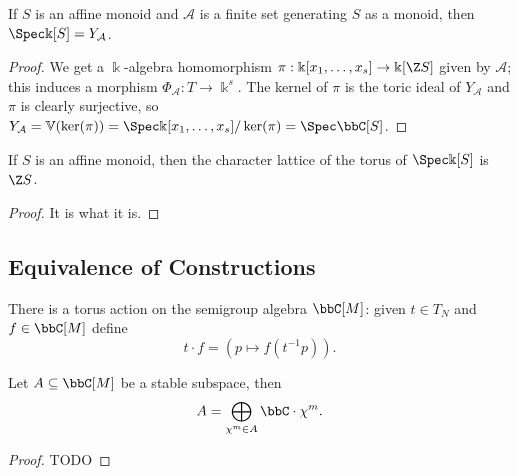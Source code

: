 \begin{proposition}
  \label{1-1-14-spec-aff-mon-alg-eq-ya}

  If $S$ is an affine monoid and $\mathcal A$ is a finite set generating $S$ as a monoid, then $\Spec \Bbbk[S] = Y_{\mathcal A}$.
\end{proposition}
\begin{proof}

  We get a $\Bbbk$-algebra homomorphism $\pi : \Bbbk[x_1, \dotsc, x_s] \to \Bbbk[\Z S]$ given by $\mathcal A$; this induces a morphism $\Phi_{\mathcal A} : T \to \Bbbk^s$. The kernel of $\pi$ is the toric ideal of $Y_{\mathcal A}$ and $\pi$ is clearly surjective, so $Y_{\mathcal A} = \mathbb V(\ker(\pi)) = \Spec \Bbbk[x_1, \dotsc, x_s] / \ker(\pi) = \Spec \bbC[S]$.
\end{proof}


\begin{proposition}
  \label{1-1-14-char-spec-aff-mon-alg}

  If $S$ is an affine monoid, then the character lattice of the torus of $\Spec \Bbbk[S]$ is $\Z S$.
\end{proposition}
\begin{proof}

  It is what it is.
\end{proof}


\subsection{Equivalence of Constructions}


\begin{definition}
  \label{1-1-tor-act-alg}

  There is a torus action on the semigroup algebra $\bbC[M]$: given $t\in T_N$ and $f\in \bbC[M]$ define
  \[
    t \cdot f = (p \mapsto f(t^{-1}p)).
  \]
\end{definition}


\begin{lemma}
  \label{1-1-16-total-red}
    Let $A \subseteq \bbC[M]$ be a stable subspace, then
    \[
      A = \bigoplus_{\chi^m \in A} \bbC \cdot \chi^m.
    \]
\end{lemma}
\begin{proof}

  TODO
\end{proof}


